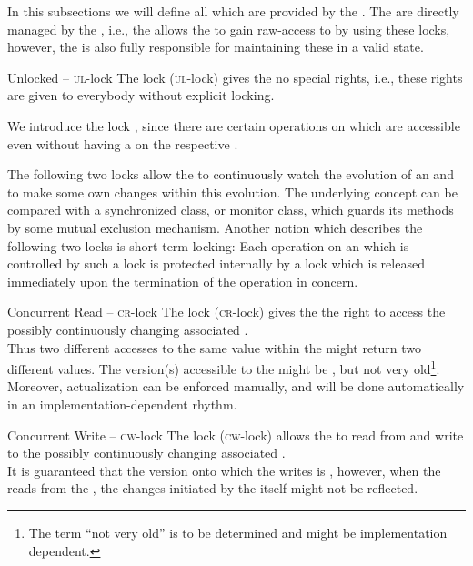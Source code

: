 \documentclass[a4paper, 12pt]{book}
\begin{document}
\newcommand{\UNLOCKED}{{\normalfont\textsc{ul}}\xspace}
\newcommand{\CONCREAD}{{\normalfont\textsc{cr}}\xspace}
\newcommand{\CONCWRITE}{{\normalfont\textsc{cw}}\xspace}
\newcommand{\PROTREAD}{{\normalfont\textsc{pr}}\xspace}
\newcommand{\PROTWRITE}{{\normalfont\textsc{pw}}\xspace}
\newcommand{\EXCLUSIVE}{{\normalfont\textsc{ex}}\xspace}


In this subsections we will define all  which are provided by the
\SYNEIGHT. The  are directly managed by the ,
i.e., the \SYNEIGHT allows the  to gain raw-access to
 by using these locks, however, the  is also fully
responsible for maintaining these  in a valid state.


\begin{definition*}{Unlocked -- \UNLOCKED-lock}
  The lock  (\UNLOCKED-lock) gives the  no special
  rights, i.e., these rights are given to everybody without explicit locking. 
\end{definition*}
%
We introduce the lock , since there are certain
operations on  which are accessible even without having a
 on the respective .

The following two locks allow the  to continuously
watch the evolution of an  and to make some own changes within this
evolution. The underlying concept can be compared with a synchronized class,
or monitor class, which guards its methods by some mutual exclusion mechanism.
%
Another notion which describes the following two locks is short-term
locking: Each operation on an  which is controlled by 
such a lock is protected internally by a lock which is released
immediately upon the termination of the operation in concern. 
%
\begin{definition*}{Concurrent Read -- \CONCREAD-lock}
  \label{def:concurrent-read-lock}
  The lock  (\CONCREAD-lock) gives the  the right
  to access the possibly continuously changing associated .\\ 
  Thus two different accesses to the same value within the  might return two different values. 
  The version(s) accessible to the  might be , but
  not very old\footnote{The term ``not very old'' is to be determined
    and might be implementation dependent.}.  Moreover, actualization can be
  enforced manually, and will be done automatically in an
  implementation-dependent rhythm.
\end{definition*}
%
\begin{definition*}{Concurrent Write -- \CONCWRITE-lock} 
  \label{def:concurrent-write-lock}
  The lock  (\CONCWRITE-lock) allows the  to read from
  and write to the possibly continuously changing associated .\\
  It is guaranteed that the version onto which the  writes is
  , however, when the  reads from the ,
  the changes initiated by the  itself might not be reflected. 
\end{definition*}
\end{document}
